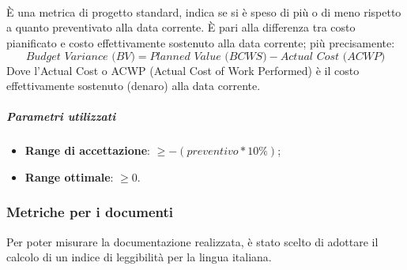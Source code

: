 \documentclass[../PianoDiQualifica.tex]{subfiles}
\begin{document}
				\paragraph{\\}
					È una metrica di progetto standard, indica se si è speso di più o
					di meno rispetto a quanto preventivato alla data corrente. È pari
					alla differenza tra costo pianificato e costo effettivamente
					sostenuto alla data corrente; più precisamente:
					\begin{equation*}
						\textit{Budget Variance (BV)} = \textit{Planned Value (BCWS)} - \textit{Actual Cost (ACWP)}
					\end{equation*}
					Dove l'Actual Cost o ACWP (Actual Cost of Work Performed) è il costo
					effettivamente sostenuto (denaro) alla data corrente.
					\subparagraph{Parametri utilizzati}
						\begin{itemize}
							\item \textbf{Range di accettazione}: $\geq -(preventivo*10\%)$;
							\item \textbf{Range ottimale}: $\geq 0$.
						\end{itemize}
			\subsubsection{Metriche per i documenti}\label{MetrichePerIDocumenti}
				Per poter misurare la documentazione realizzata, è stato scelto di adottare
				il calcolo di un indice di leggibilità per la lingua italiana.
\end{document}
